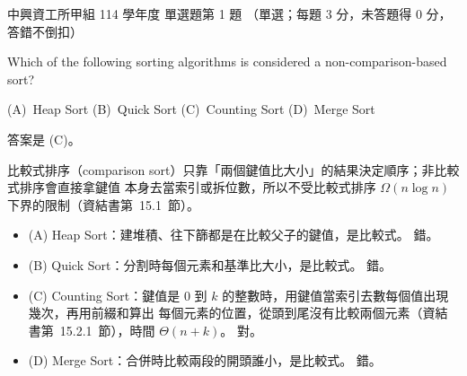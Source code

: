 \begin{pastexam}[label={px:nchu-114-dsa-01}]{中興資工所甲組 114 學年度 單選題第 1 題}
（單選；每題 3 分，未答題得 0 分，答錯不倒扣）

Which of the following sorting algorithms is considered a non-comparison-based sort?

(A)~Heap Sort \qquad (B)~Quick Sort \qquad (C)~Counting Sort \qquad (D)~Merge Sort
\end{pastexam}

\begin{pastsoln}
答案是 (C)。

比較式排序（comparison sort）只靠「兩個鍵值比大小」的結果決定順序；非比較式排序會直接拿鍵值
本身去當索引或拆位數，所以不受比較式排序 $\Omega(n \log n)$ 下界的限制（資結書第~15.1~節）。
\begin{itemize}
\item (A) Heap Sort：建堆積、往下篩都是在比較父子的鍵值，是比較式。 錯。
\item (B) Quick Sort：分割時每個元素和基準比大小，是比較式。 錯。
\item (C) Counting Sort：鍵值是 $0$ 到 $k$ 的整數時，用鍵值當索引去數每個值出現幾次，再用前綴和算出
每個元素的位置，從頭到尾沒有比較兩個元素（資結書第~15.2.1~節），時間 $\Theta(n + k)$。 對。
\item (D) Merge Sort：合併時比較兩段的開頭誰小，是比較式。 錯。
\end{itemize}
\end{pastsoln}
